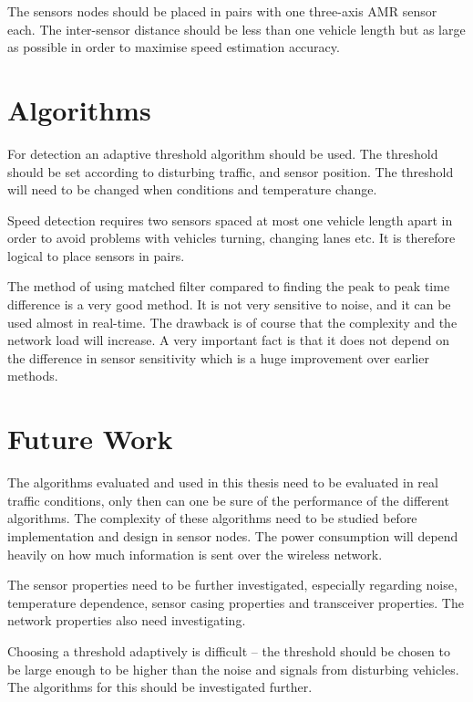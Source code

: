 The sensors nodes should be placed in pairs with one three-axis AMR sensor each. The inter-sensor distance should be less than one vehicle length but as large as possible in order to maximise speed estimation accuracy.

\section{Algorithms}

For detection an adaptive threshold algorithm should be used. The threshold should be set according to disturbing traffic, and sensor position. The threshold will need to be changed when conditions and temperature change.

Speed detection requires two sensors spaced at most one vehicle length apart in order to avoid problems with vehicles turning, changing lanes etc. It is therefore logical to place sensors in pairs.

The method of using matched filter compared to finding the peak to peak time difference is a very good method. It is not very sensitive to noise, and it can be used almost in real-time. The drawback is of course that the complexity and the network load will increase. A very important fact is that it does not depend on the difference in sensor sensitivity which is a huge improvement over earlier methods.

\section{Future Work}

The algorithms evaluated and used in this thesis need to be evaluated in real traffic conditions, only then can one be sure of the performance of the different algorithms. The complexity of these algorithms need to be studied before implementation and design in sensor nodes. The power consumption will depend heavily on how much information is sent over the wireless network.

The sensor properties need to be further investigated, especially regarding noise, temperature dependence, sensor casing properties and transceiver properties. The network properties also need investigating.

Choosing a threshold adaptively is difficult -- the threshold should be chosen to be large  enough to be higher than the noise and signals from disturbing vehicles. The algorithms for this should be investigated further.
